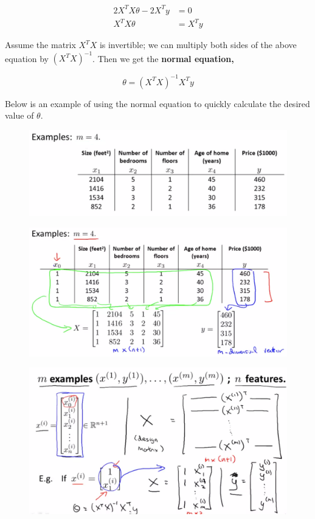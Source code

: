 \begin{align*}
    2X^T X\theta - 2X^T y &= 0 \\
    X^T X\theta &= X^T y
\end{align*}

\noindent Assume the matrix $X^T X$ is invertible; we can multiply both sides of the above equation
by $(X^T X)^{-1}$. Then we get the \textbf{normal equation,}

\begin{equation*}
    \theta = (X^T X)^{-1} X^T y
\end{equation*}

\noindent Below is an example of using the normal equation to quickly calculate the desired value of
$\theta$.

\begin{figure}[hbt!]
    \centering
    \includegraphics[scale=0.5]{Resources/Norm_Equation_Example}
\end{figure}

\pagebreak

\begin{figure}[hbt!]
    \centering
    \includegraphics[scale=0.4]{Resources/Norm_Equation_Example2}
\end{figure}

\begin{figure}[hbt!]
    \centering
    \includegraphics[scale=0.4]{Resources/Norm_Equation_Example3}
\end{figure}

